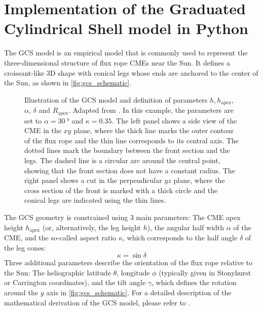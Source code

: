 \chapter{Implementation of the Graduated Cylindrical Shell model in Python}
\label{chp:GCS_Python}

The \acl{GCS} model \citep[\acs{GCS},][]{Thernisien-2006-GCS,Thernisien-2011-GCS} is an empirical model that is commonly used to represent the three-dimensional structure of flux rope \acp{CME}  near the Sun. It defines a croissant-like 3D shape with conical legs whose ends are anchored to the center of the Sun, as shown in \autoref{fig:gcs_schematic}.

\begin{figure}
    
    \caption[Illustration of the \acs{GCS} model]{Illustration of the \ac{GCS} model and definition of parameters $h, h_\text{apex}$, $\alpha$, $\delta$ and $R_\text{apex}$. Adapted from \citet{Thernisien-2011-GCS}. In this example, the parameters are set to $\alpha = \SI{30}{\degree}$ and $\kappa = 0.35$. The left panel shows a side view of the \ac{CME} in the $xy$ plane, where the thick line marks the outer contour of the flux rope and the thin line corresponds to its central axis. The dotted lines mark the boundary between the front section and the legs. The dashed line is a circular arc around the central point, showing that the front section does not have a constant radius. The right panel shows a cut in the perpendicular $yz$ plane, where the cross section of the front is marked with a thick circle and the conical legs are indicated using the thin lines.}
    \label{fig:gcs_schematic}
\end{figure}

The \ac{GCS} geometry is constrained using 3 main parameters: The \ac{CME} apex height $h_\text{apex}$ (or, alternatively, the leg height $h$), the angular half width $\alpha$ of the \ac{CME}, and the so-called aspect ratio $\kappa$, which corresponds to the half angle $\delta$ of the leg cones:
\begin{equation}
    \kappa = \sin \delta
\end{equation}
Three additional parameters describe the orientation of the flux rope relative to the Sun: The heliographic latitude $\theta$, longitude $\phi$ (typically given in Stonyhurst or Carrington coordinates), and the tilt angle $\gamma$, which defines the rotation around the $y$ axis in \autoref{fig:gcs_schematic}. For a detailed description of the mathematical derivation of the \ac{GCS} model, please refer to \citet{Thernisien-2011-GCS}.


